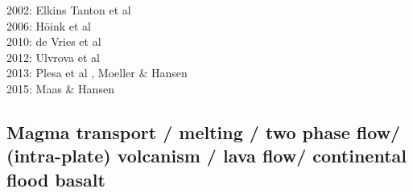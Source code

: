 \begin{scriptsize}
2002: Elkins Tanton et al \cite{elvh02}\\
2006: H\"oink et al\cite{hosh06}\\
2010: de Vries et al \cite{devv10}\\
2012: Ulvrova et al \cite{ullc12}\\
2013: Plesa et al \cite{plth13}, Moeller \& Hansen \cite{moha13}\\
2015: Maas \& Hansen \cite{maha15}
\end{scriptsize}

\subsection{Magma transport / melting / two phase flow/ (intra-plate) volcanism / lava flow/ 
continental flood basalt}

